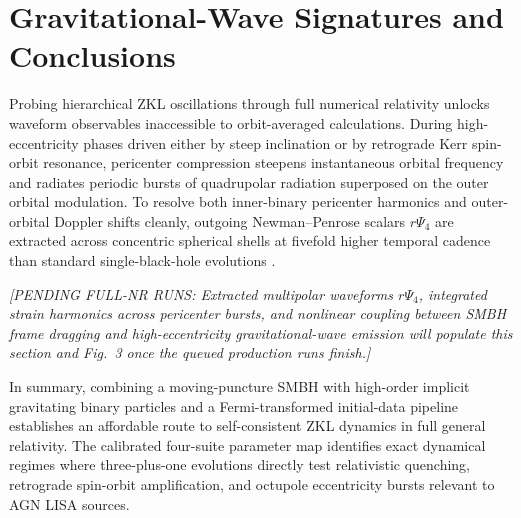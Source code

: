 \documentclass[aps,prl,twocolumn,10pt,superscriptaddress,nofootinbib,longbibliography,floatfix]{revtex4-2}
\newcommand{\rPsifour}{r\Psi_4}
\begin{document}
\section{Gravitational-Wave Signatures and Conclusions}
Probing hierarchical ZKL oscillations through full numerical relativity unlocks waveform observables inaccessible to orbit-averaged calculations. During high-eccentricity phases driven either by steep inclination or by retrograde Kerr spin-orbit resonance, pericenter compression steepens instantaneous orbital frequency and radiates periodic bursts of quadrupolar radiation superposed on the outer orbital modulation. To resolve both inner-binary pericenter harmonics and outer-orbital Doppler shifts cleanly, outgoing Newman--Penrose scalars $\rPsifour$ are extracted across concentric spherical shells at fivefold higher temporal cadence than standard single-black-hole evolutions \cite{Bishop:2016lgv,Reisswig:2010di}.

\textit{[PENDING FULL-NR RUNS: Extracted multipolar waveforms $\rPsifour$, integrated strain harmonics across pericenter bursts, and nonlinear coupling between SMBH frame dragging and high-eccentricity gravitational-wave emission will populate this section and Fig.~3 once the queued production runs finish.]}

In summary, combining a moving-puncture SMBH with high-order implicit gravitating binary particles and a Fermi-transformed initial-data pipeline establishes an affordable route to self-consistent ZKL dynamics in full general relativity. The calibrated four-suite parameter map identifies exact dynamical regimes where three-plus-one evolutions directly test relativistic quenching, retrograde spin-orbit amplification, and octupole eccentricity bursts relevant to AGN LISA sources.

\appendix
\end{document}
